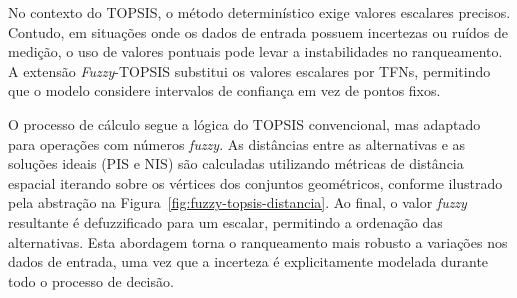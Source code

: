No contexto do \gls{TOPSIS}, o método determinístico exige valores escalares precisos. Contudo, em situações onde os dados de entrada possuem incertezas ou ruídos de medição, o uso de valores pontuais pode levar a instabilidades no ranqueamento. A extensão \textit{Fuzzy}-TOPSIS substitui os valores escalares por \glspl{TFN}, permitindo que o modelo considere intervalos de confiança em vez de pontos fixos.

O processo de cálculo segue a lógica do \gls{TOPSIS} convencional, mas adaptado para operações com números \textit{fuzzy}. As distâncias entre as alternativas e as soluções ideais (\gls{PIS} e \gls{NIS}) são calculadas utilizando métricas de distância espacial iterando sobre os vértices dos conjuntos geométricos, conforme ilustrado pela abstração na Figura~\ref{fig:fuzzy-topsis-distancia}. Ao final, o valor \textit{fuzzy} resultante é defuzzificado para um escalar, permitindo a ordenação das alternativas. Esta abordagem torna o ranqueamento mais robusto a variações nos dados de entrada, uma vez que a incerteza é explicitamente modelada durante todo o processo de decisão.

